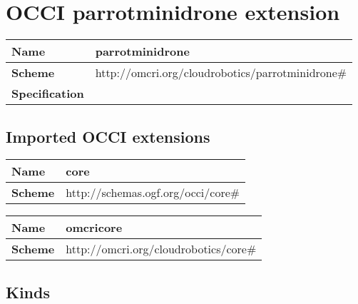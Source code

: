 \section{OCCI parrotminidrone extension}
\begin{center}
\begin{tabular}{|l|l|}
  \hline
  \textbf{Name} & parrotminidrone \\
  \hline  
  \textbf{Scheme} & http://omcri.org/cloudrobotics/parrotminidrone\# \\
  \hline
  \textbf{Specification} &  \\
  \hline
\end{tabular}
\end{center}

\subsection{Imported OCCI extensions}

\begin{center} 
\begin{tabular}{|l|l|}
  \hline
  \textbf{Name} & core \\
  \hline  
  \textbf{Scheme} & http://schemas.ogf.org/occi/core\# \\
  \hline
\end{tabular}
\end{center}
\begin{center} 
\begin{tabular}{|l|l|}
  \hline
  \textbf{Name} & omcricore \\
  \hline  
  \textbf{Scheme} & http://omcri.org/cloudrobotics/core\# \\
  \hline
\end{tabular}
\end{center}


\subsection{Kinds}
